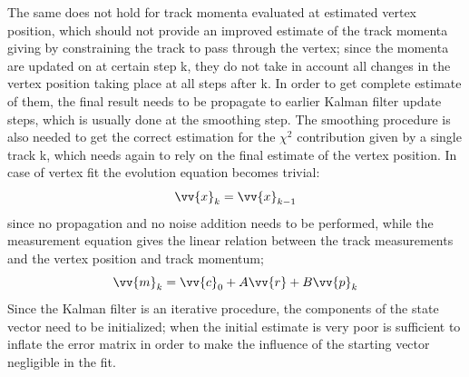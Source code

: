 The same does not hold for track momenta evaluated at estimated vertex position, which should not provide an improved estimate of the track momenta giving by constraining the track to pass through the vertex; since the momenta are updated on at certain step k, they do not take in account all changes in the vertex position taking place at all steps after k.
In order to get  complete estimate of them, the final result needs to be propagate to earlier Kalman filter update steps, which is usually done at the smoothing step. The smoothing procedure is also needed to get the correct estimation for the $\chi^2$ contribution given by a single track k, which needs again to rely on the final estimate of the vertex position.
In case of vertex fit the evolution equation becomes trivial:
\begin{equation}
\vv{x}_k = \vv{x}_{k-1}
\end{equation}
since no propagation and no noise addition needs to be performed, while the measurement equation gives the linear relation between the track measurements and the vertex position and track momentum;
\begin{equation}
\vv{m}_k = \vv{c}_0 + A\vv{r} + B\vv{p}_k
\end{equation}
Since the Kalman filter is an iterative procedure, the components of the state vector need to be initialized; when the initial estimate is very poor is sufficient to inflate the error matrix in order to make the influence of the starting vector negligible in the fit.
\pagebreak
